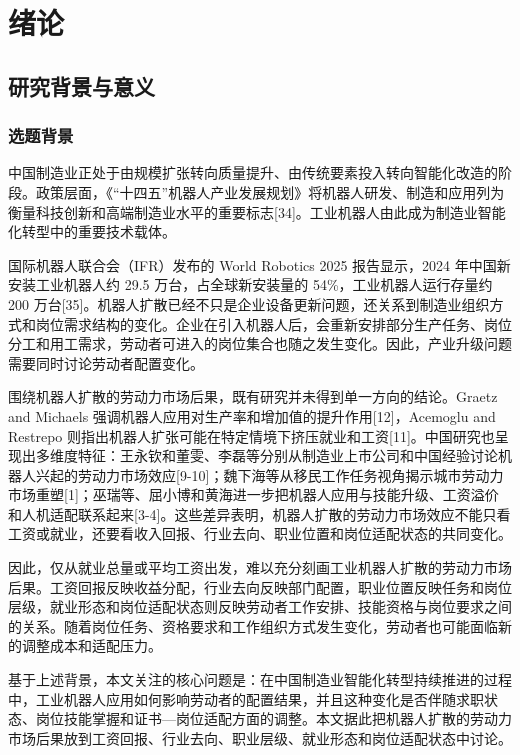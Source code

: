 \documentclass[UTF8, zihao=-4, a4paper, openany, fontset=none]{ctexrep}
\numberwithin{equation}{chapter}
\newcommand{\hqufronttoc}{%
  \clearpage
  \markboth{目录}{目录}
  \renewcommand{\contentsname}{\texorpdfstring{目\quad 录}{目录}}
  \tableofcontents
  \clearpage
  \pagenumbering{arabic}
  \pagestyle{hqumain}
}
\begin{document}
\hqufronttoc

\chapter{绪论}\label{ux7eeaux8bba}

\section{研究背景与意义}\label{ux7814ux7a76ux80ccux666fux4e0eux610fux4e49}

\subsection{选题背景}\label{ux9009ux9898ux80ccux666f}

中国制造业正处于由规模扩张转向质量提升、由传统要素投入转向智能化改造的阶段。政策层面，《``十四五''机器人产业发展规划》将机器人研发、制造和应用列为衡量科技创新和高端制造业水平的重要标志{[}34{]}。工业机器人由此成为制造业智能化转型中的重要技术载体。

国际机器人联合会（IFR）发布的 World Robotics 2025 报告显示，2024 年中国新安装工业机器人约 29.5 万台，占全球新安装量的 54\%，工业机器人运行存量约 200 万台{[}35{]}。机器人扩散已经不只是企业设备更新问题，还关系到制造业组织方式和岗位需求结构的变化。企业在引入机器人后，会重新安排部分生产任务、岗位分工和用工需求，劳动者可进入的岗位集合也随之发生变化。因此，产业升级问题需要同时讨论劳动者配置变化。

围绕机器人扩散的劳动力市场后果，既有研究并未得到单一方向的结论。Graetz and Michaels 强调机器人应用对生产率和增加值的提升作用{[}12{]}，Acemoglu and Restrepo 则指出机器人扩张可能在特定情境下挤压就业和工资{[}11{]}。中国研究也呈现出多维度特征：王永钦和董雯、李磊等分别从制造业上市公司和中国经验讨论机器人兴起的劳动力市场效应{[}9-10{]}；魏下海等从移民工作任务视角揭示城市劳动力市场重塑{[}1{]}；巫瑞等、屈小博和黄海进一步把机器人应用与技能升级、工资溢价和人机适配联系起来{[}3-4{]}。这些差异表明，机器人扩散的劳动力市场效应不能只看工资或就业，还要看收入回报、行业去向、职业位置和岗位适配状态的共同变化。

因此，仅从就业总量或平均工资出发，难以充分刻画工业机器人扩散的劳动力市场后果。工资回报反映收益分配，行业去向反映部门配置，职业位置反映任务和岗位层级，就业形态和岗位适配状态则反映劳动者工作安排、技能资格与岗位要求之间的关系。随着岗位任务、资格要求和工作组织方式发生变化，劳动者也可能面临新的调整成本和适配压力。

基于上述背景，本文关注的核心问题是：在中国制造业智能化转型持续推进的过程中，工业机器人应用如何影响劳动者的配置结果，并且这种变化是否伴随求职状态、岗位技能掌握和证书---岗位适配方面的调整。本文据此把机器人扩散的劳动力市场后果放到工资回报、行业去向、职业层级、就业形态和岗位适配状态中讨论。
\end{document}
